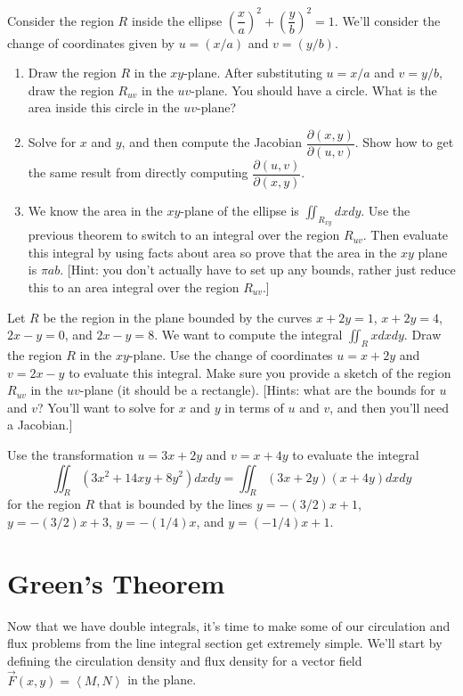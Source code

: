 \begin{problem}
 Consider the region $R$ inside the ellipse $\left(\dfrac{x}{a}\right)^2+\left(\dfrac{y}{b}\right)^2=1$.  We'll consider the change of coordinates given by $u=(x/a)$ and $v=(y/b)$.
\begin{enumerate}
 \item Draw the region $R$ in the $xy$-plane.  After substituting $u=x/a$ and $v=y/b$, draw the region $R_{uv}$ in the $uv$-plane.  You should have a circle.  What is the area inside this circle in the $uv$-plane?
 \item Solve for $x$ and $y$, and then compute the Jacobian  $\dfrac{\partial (x,y)}{\partial (u,v)}$. Show how to get the same result from directly computing $\dfrac{\partial (u,v)}{\partial (x,y)}$.
 \item We know the area in the $xy$-plane of the ellipse is $\iint_{R_{xy}} dxdy$. Use the previous theorem to switch to an integral over the region $R_{uv}$.  Then evaluate this integral by using facts about area so prove that the area in the $xy$ plane is $\pi a b$. [Hint: you don't actually have to set up any bounds, rather just reduce this to an area integral over the region $R_{uv}$.] 
\end{enumerate}

\end{problem}


\begin{problem}
Let $R$ be the region in the plane bounded by the curves $x+2y=1$, $x+2y=4$, $2x-y=0$, and $2x-y=8$.  We want to compute the integral $\iint_R xdxdy$. Draw the region $R$ in the $xy$-plane. Use the change of coordinates $u=x+2y$ and $v=2x-y$ to evaluate this integral. Make sure you provide a sketch of the region $R_{uv}$ in the $uv$-plane (it should be a rectangle).  
[Hints: what are the bounds for $u$ and $v$?  You'll want to solve for $x$ and $y$ in terms of $u$ and $v$, and then you'll need a Jacobian.]
\end{problem}


\begin{problem}
%
 Use the transformation $u=3x+2y$ and $v=x+4y$ to evaluate the integral $$\iint_R (3x^2+14xy+8y^2)dxdy =\iint_R (3x+2y)(x+4y)dxdy $$ for the region $R$ that is bounded by the lines $y=-(3/2)x+1$, $y=-(3/2)x+3$, $y=-(1/4)x$, and  $y=(-1/4)x+1$.
\end{problem}

\section{Green's Theorem}
Now that we have double integrals, it's time to make some of our circulation and flux problems from the line integral section get extremely simple. We'll start by defining the circulation density and flux density for a vector field $\vec F(x,y)=\left<M,N\right>$ in the plane.

